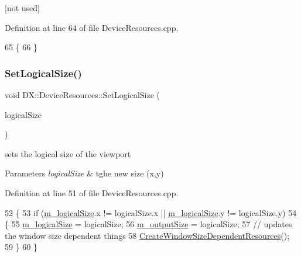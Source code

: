 \mbox{[}not used\mbox{]} 



Definition at line 64 of file Device\+Resources.\+cpp.


\begin{DoxyCode}
65 \{
66 \}
\end{DoxyCode}
\mbox{\label{class_d_x_1_1_device_resources_a5a0453913627052d011544e4cff2f3e6}} 
\subsubsection{\texorpdfstring{Set\+Logical\+Size()}{SetLogicalSize()}}
{\footnotesize\ttfamily void D\+X\+::\+Device\+Resources\+::\+Set\+Logical\+Size (\begin{DoxyParamCaption}\item[{Direct\+X\+::\+X\+M\+F\+L\+O\+A\+T2}]{logical\+Size }\end{DoxyParamCaption})}



sets the logical size of the viewport 


\begin{DoxyParams}{Parameters}
{\em logical\+Size} & tghe new size (x,y) \\
\hline
\end{DoxyParams}


Definition at line 51 of file Device\+Resources.\+cpp.


\begin{DoxyCode}
52 \{
53     \textcolor{keywordflow}{if} (\mbox{\hyperlink{class_d_x_1_1_device_resources_a4689509084ecb52b9edf0f6e4ed886d9}{m\_logicalSize}}.x != logicalSize.x || \mbox{\hyperlink{class_d_x_1_1_device_resources_a4689509084ecb52b9edf0f6e4ed886d9}{m\_logicalSize}}.y != logicalSize.y)
54     \{
55         \mbox{\hyperlink{class_d_x_1_1_device_resources_a4689509084ecb52b9edf0f6e4ed886d9}{m\_logicalSize}} = logicalSize;
56         \mbox{\hyperlink{class_d_x_1_1_device_resources_aa102e231efe8bb03f3a91728f8477d08}{m\_outputSize}} = logicalSize;
57         \textcolor{comment}{// updates the window size dependent things}
58         \mbox{\hyperlink{class_d_x_1_1_device_resources_a9556306971d5484caaa5a2aac42f253e}{CreateWindowSizeDependentResources}}();
59     \}
60 \}
\end{DoxyCode}
\mbox{\label{class_d_x_1_1_device_resources_a76181b89d31d8aef4c8397fcee2c3d61}} 
